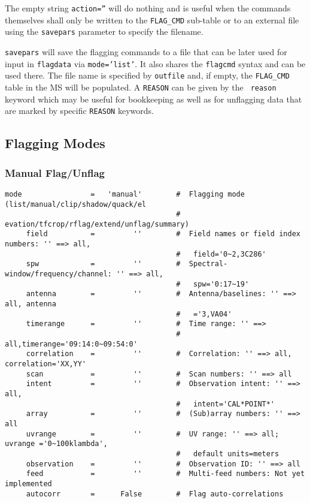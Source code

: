 The empty string {\tt action=''} will do nothing and is useful when the
commands themselves shall only be written to the {\tt FLAG\_CMD}
sub-table or to an external file using the {\tt savepars} parameter to
specify the filename.

{\tt savepars} will save the flagging commands to a file that can be
later used for input in {\tt flagdata} via {\tt mode='list'}. It also
shares the {\tt flagcmd} syntax and can be used there. The file name
is specified by {\tt outfile} and, if empty, the {\tt FLAG\_CMD} table
in the MS will be populated.  A {\tt REASON} can be given by the {\tt
  reason} keyword which may be useful for bookkeeping as well as for
unflagging data that are marked by specific {\tt REASON}
keywords.




\subsection{Flagging Modes}
\label{section:edit.flagdata.mode}

\subsubsection{Manual Flag/Unflag}
\label{section:edit.flagdata.mode.manual}

\small
\begin{verbatim}
mode                =   'manual'        #  Flagging mode (list/manual/clip/shadow/quack/el
                                        #   evation/tfcrop/rflag/extend/unflag/summary)
     field          =         ''        #  Field names or field index numbers: '' ==> all,
                                        #   field='0~2,3C286'
     spw            =         ''        #  Spectral-window/frequency/channel: '' ==> all,
                                        #   spw='0:17~19'
     antenna        =         ''        #  Antenna/baselines: '' ==> all, antenna
                                        #   ='3,VA04'
     timerange      =         ''        #  Time range: '' ==>
                                        #   all,timerange='09:14:0~09:54:0'
     correlation    =         ''        #  Correlation: '' ==> all, correlation='XX,YY'
     scan           =         ''        #  Scan numbers: '' ==> all
     intent         =         ''        #  Observation intent: '' ==> all,
                                        #   intent='CAL*POINT*'
     array          =         ''        #  (Sub)array numbers: '' ==> all
     uvrange        =         ''        #  UV range: '' ==> all; uvrange ='0~100klambda',
                                        #   default units=meters
     observation    =         ''        #  Observation ID: '' ==> all
     feed           =         ''        #  Multi-feed numbers: Not yet implemented
     autocorr       =      False        #  Flag auto-correlations
\end{verbatim}
\normalsize


